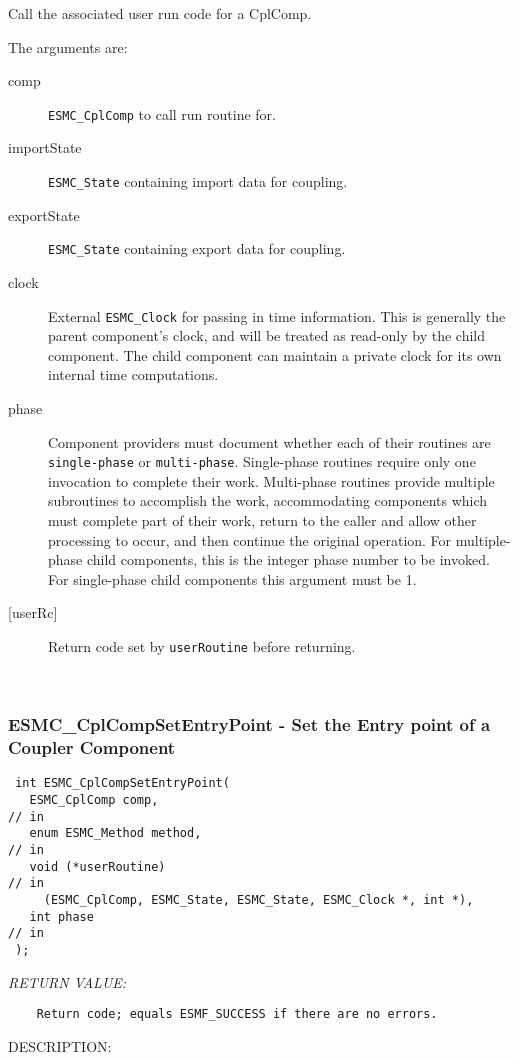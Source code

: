   
    Call the associated user run code for a CplComp.
  
    The arguments are:
    \begin{description}
    \item[comp]
      {\tt ESMC\_CplComp} to call run routine for.
    \item[importState]
      {\tt ESMC\_State} containing import data for coupling.
    \item[exportState]
      {\tt ESMC\_State} containing export data for coupling.
    \item[clock]
      External {\tt ESMC\_Clock} for passing in time information. This is 
      generally the parent component's clock, and will be treated as read-only
      by the child component. The child component can maintain a private clock
      for its own internal time computations.
    \item[phase]
      Component providers must document whether each of their routines are 
      {\tt single-phase} or {\tt multi-phase}. Single-phase routines require 
      only one invocation to complete their work. Multi-phase routines provide
      multiple subroutines to accomplish the work, accommodating components
      which must complete part of their work, return to the caller and allow 
      other processing to occur, and then continue the original operation. 
      For multiple-phase child components, this is the integer phase number to
      be invoked. For single-phase child components this argument must be 1.
    \item[{[userRc]}]
      Return code set by {\tt userRoutine} before returning.
    \end{description}
   
 
\mbox{}\hrulefill\ 
 
\subsubsection [ESMC\_CplCompSetEntryPoint] {ESMC\_CplCompSetEntryPoint - Set the Entry point of a Coupler Component}


  
\begin{verbatim} int ESMC_CplCompSetEntryPoint(
   ESMC_CplComp comp,                                                // in
   enum ESMC_Method method,                                          // in
   void (*userRoutine)                                               // in
     (ESMC_CplComp, ESMC_State, ESMC_State, ESMC_Clock *, int *),
   int phase                                                         // in
 );\end{verbatim}{\em RETURN VALUE:}
\begin{verbatim}    Return code; equals ESMF_SUCCESS if there are no errors.\end{verbatim}
{\sf DESCRIPTION:\\ }


